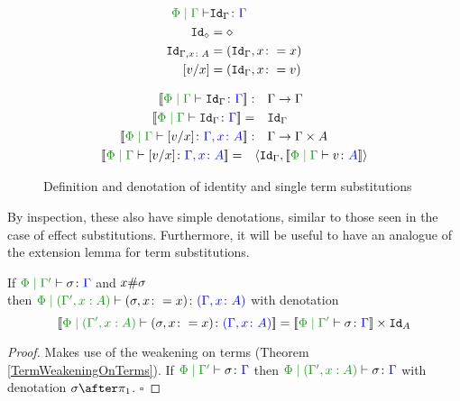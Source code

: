 \documentclass{Report}
\begin{document}
\begin{figure}[H]
    \centering

    \begin{minipage}{.45\linewidth}
        \begin{framed}
            \begin{align*}
                \etyperelation{\P}{\G}{&\Id{\G}}{\G}\\
                \Id{\nil} & = \nil\\
                \Id{\gax} & = (\idg, x\setto x)\\
                \ssub{x}{v} & = (\idg, x\setto v)
            \end{align*}
        \end{framed}
    \end{minipage}
    \quad
    \begin{minipage}{.45\linewidth}
        \begin{framed}
            \begin{align*}
                \deno{\etyperelation{\P}{\G}{\Id{\G}}{\G}}: &\quad \G\rightarrow\G\\
                \deno{\etyperelation{\P}{\G}{\Id{\G}}{\G}} = &\quad  \idg\\
                \deno{\etyperelation{\P}{\G}{\ssub{x}{v}}{\gax}}: &\quad \G\rightarrow \G\times A\\
                \deno{\etyperelation{\P}{\G}{\ssub{x}{v}}{\gax}} =\quad & \pr{\idg}{\deno{\gpetyperelation{v}{A}}}
            \end{align*}
        \end{framed}
    \end{minipage}
    
    \caption{Definition and denotation of identity and single term substitutions}
    \label{TermSubstitutionIdAndSingle}
\end{figure}



By inspection, these also have simple denotations, similar to those seen in the case of effect substitutions. Furthermore, it will be useful to have an analogue of the extension lemma for term substitutions.


\begin{framed}
    \begin{lemma}
        If $\etyperelation{\P}{\G'}{\si}{\G}$ and $x\#\sigma$\\ then $\etyperelation{\P}{(\G',x: A)}{(\si, x\setto x)}{(\gax)}$ with denotation $$\deno{\etyperelation{\P}{(\G',x: A)}{(\si, x\setto x)}{(\gax)}} = \deno{\etyperelation{\P}{\G'}{\si}{\G}} \times \Id{A}$$
    \end{lemma}
    
    \begin{proof}
         Makes use of the weakening on terms (Theorem \ref{TermWeakeningOnTerms}). If $\etyperelation{\P}{\G'}{\si}{\G}$ then $\etyperelation{\P}{(\G', x:A) }{\si}{\G}$ with denotation $\si\after\p$. $\square$
    \end{proof}
\end{framed}
\end{document}
